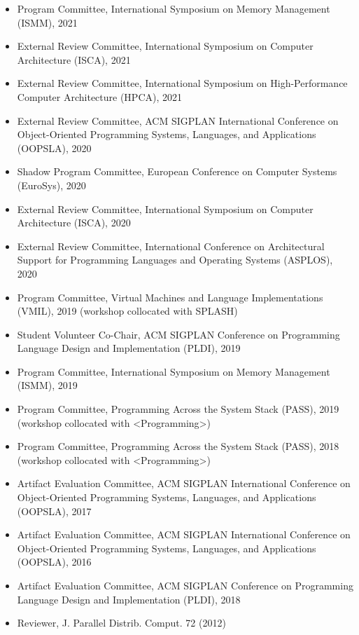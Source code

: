 \documentclass[singlecolumn,singlespace,11pt,a4paper]{article}
\begin{document}
\begin{itemize}
\item Program Committee, International Symposium on Memory Management (ISMM), 2021
\item External Review Committee, International Symposium on Computer Architecture (ISCA), 2021
\item External Review Committee, International Symposium on High-Performance Computer Architecture (HPCA), 2021
\item External Review Committee, ACM SIGPLAN International Conference on Object-Oriented Programming Systems, Languages, and Applications (OOPSLA), 2020
\item Shadow Program Committee, European Conference on Computer Systems (EuroSys), 2020
\item External Review Committee, International Symposium on Computer Architecture (ISCA), 2020
\item External Review Committee, International Conference on Architectural Support for Programming Languages and Operating Systems (ASPLOS), 2020
\item Program Committee, Virtual Machines and Language Implementations (VMIL), 2019 (workshop collocated with SPLASH)
\item Student Volunteer Co-Chair, ACM SIGPLAN Conference on Programming Language Design and Implementation (PLDI), 2019
\item Program Committee, International Symposium on Memory Management (ISMM), 2019
\item Program Committee, Programming Across the System Stack (PASS), 2019 (workshop collocated with <Programming>) 
\item Program Committee, Programming Across the System Stack (PASS), 2018 (workshop collocated with  <Programming>) 
\item Artifact Evaluation Committee, ACM SIGPLAN International Conference on Object-Oriented Programming Systems, Languages, and Applications (OOPSLA), 2017  
\item Artifact Evaluation Committee, ACM SIGPLAN International Conference on Object-Oriented Programming Systems, Languages, and Applications (OOPSLA), 2016  
\item Artifact Evaluation Committee, ACM SIGPLAN Conference on Programming Language Design and Implementation (PLDI), 2018
\item Reviewer, J. Parallel Distrib. Comput. 72 (2012) 
\end{itemize}
\end{document}
